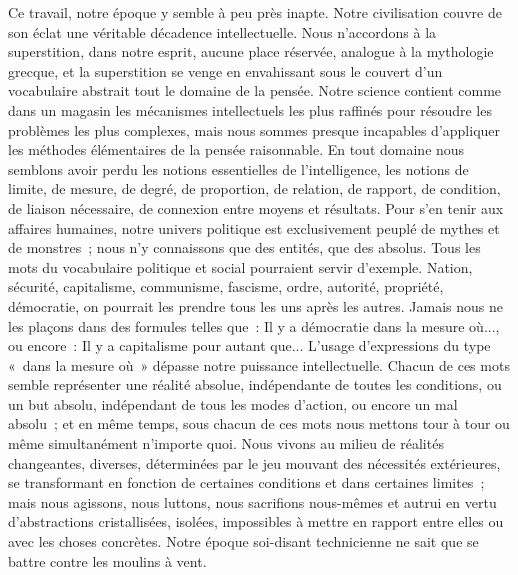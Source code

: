 \documentclass[french,twoside]{book} %
\begin{document}
Ce travail, notre époque y semble à peu près inapte. Notre civilisation couvre de son éclat une véritable décadence intellectuelle. Nous n'accordons à la superstition, dans notre esprit, aucune place réservée, analogue à la mytho­logie grecque, et la superstition se venge en envahissant sous le couvert d'un vocabulaire abstrait tout le domaine de la pensée. Notre science contient comme dans un magasin les mécanismes intellectuels les plus raffinés pour résoudre les problèmes les plus complexes, mais nous sommes presque incapables d'appliquer les méthodes élémentaires de la pensée raisonnable. En tout domaine nous semblons avoir perdu les notions essentielles de l'intelli­gence, les notions de limite, de mesure, de degré, de proportion, de relation, de rapport, de condition, de liaison nécessaire, de connexion entre moyens et résultats. Pour s'en tenir aux affaires humaines, notre univers politique est exclusivement peuplé de mythes et de monstres ; nous n'y connaissons que des entités, que des absolus. Tous les mots du vocabulaire politique et social pourraient servir d'exemple. Nation, sécurité, capitalisme, communisme, fas­cisme, ordre, autorité, propriété, démocratie, on pourrait les prendre tous les uns après les autres. Jamais nous ne les plaçons dans des formules telles que : Il y a démocratie dans la mesure où..., ou encore : Il y a capitalisme pour autant que... L'usage d'expressions du type « dans la mesure où » dépasse notre puissance intellectuelle. Chacun de ces mots semble représenter une réalité absolue, indépendante de toutes les conditions, ou un but absolu, indépendant de tous les modes d'action, ou encore un mal absolu ; et en même temps, sous chacun de ces mots nous mettons tour à tour ou même simulta­nément n'importe quoi. Nous vivons au milieu de réalités changeantes, diverses, déterminées par le jeu mouvant des nécessités extérieures, se transformant en fonction de certaines conditions et dans certaines limites ; mais nous agissons, nous luttons, nous sacrifions nous-mêmes et autrui en vertu d'abstractions cristallisées, isolées, impossibles à mettre en rapport entre elles ou avec les choses concrètes. Notre époque soi-disant technicienne ne sait que se battre contre les moulins à vent.\par
\end{document}
